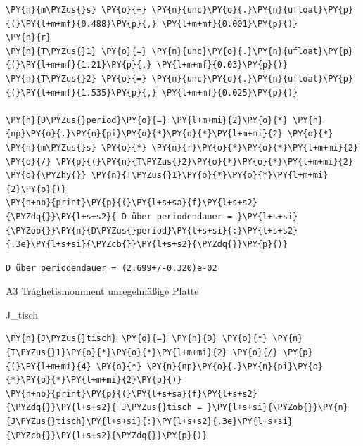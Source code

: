     \begin{tcolorbox}[breakable, size=fbox, boxrule=1pt, pad at break*=1mm,colback=cellbackground, colframe=cellborder]
\begin{Verbatim}[commandchars=\\\{\}]
\PY{n}{m\PYZus{}s} \PY{o}{=} \PY{n}{unc}\PY{o}{.}\PY{n}{ufloat}\PY{p}{(}\PY{l+m+mf}{0.488}\PY{p}{,} \PY{l+m+mf}{0.001}\PY{p}{)}
\PY{n}{r}
\PY{n}{T\PYZus{}1} \PY{o}{=} \PY{n}{unc}\PY{o}{.}\PY{n}{ufloat}\PY{p}{(}\PY{l+m+mf}{1.21}\PY{p}{,} \PY{l+m+mf}{0.03}\PY{p}{)}
\PY{n}{T\PYZus{}2} \PY{o}{=} \PY{n}{unc}\PY{o}{.}\PY{n}{ufloat}\PY{p}{(}\PY{l+m+mf}{1.535}\PY{p}{,} \PY{l+m+mf}{0.025}\PY{p}{)} 

\PY{n}{D\PYZus{}period}\PY{o}{=} \PY{l+m+mi}{2}\PY{o}{*} \PY{n}{np}\PY{o}{.}\PY{n}{pi}\PY{o}{*}\PY{o}{*}\PY{l+m+mi}{2} \PY{o}{*} \PY{n}{m\PYZus{}s} \PY{o}{*} \PY{n}{r}\PY{o}{*}\PY{o}{*}\PY{l+m+mi}{2} \PY{o}{/} \PY{p}{(}\PY{n}{T\PYZus{}2}\PY{o}{*}\PY{o}{*}\PY{l+m+mi}{2} \PY{o}{\PYZhy{}} \PY{n}{T\PYZus{}1}\PY{o}{*}\PY{o}{*}\PY{l+m+mi}{2}\PY{p}{)}
\PY{n+nb}{print}\PY{p}{(}\PY{l+s+sa}{f}\PY{l+s+s2}{\PYZdq{}}\PY{l+s+s2}{ D über periodendauer = }\PY{l+s+si}{\PYZob{}}\PY{n}{D\PYZus{}period}\PY{l+s+si}{:}\PY{l+s+s2}{.3e}\PY{l+s+si}{\PYZcb{}}\PY{l+s+s2}{\PYZdq{}}\PY{p}{)}
\end{Verbatim}
\end{tcolorbox}

    \begin{Verbatim}[commandchars=\\\{\}]
 D über periodendauer = (2.699+/-0.320)e-02
    \end{Verbatim}

    A3 Trághetismomment unregelmäßige Platte

    J\_tisch

    \begin{tcolorbox}[breakable, size=fbox, boxrule=1pt, pad at break*=1mm,colback=cellbackground, colframe=cellborder]
\begin{Verbatim}[commandchars=\\\{\}]
\PY{n}{J\PYZus{}tisch} \PY{o}{=} \PY{n}{D} \PY{o}{*} \PY{n}{T\PYZus{}1}\PY{o}{*}\PY{o}{*}\PY{l+m+mi}{2} \PY{o}{/} \PY{p}{(}\PY{l+m+mi}{4} \PY{o}{*} \PY{n}{np}\PY{o}{.}\PY{n}{pi}\PY{o}{*}\PY{o}{*}\PY{l+m+mi}{2}\PY{p}{)}
\PY{n+nb}{print}\PY{p}{(}\PY{l+s+sa}{f}\PY{l+s+s2}{\PYZdq{}}\PY{l+s+s2}{ J\PYZus{}tisch = }\PY{l+s+si}{\PYZob{}}\PY{n}{J\PYZus{}tisch}\PY{l+s+si}{:}\PY{l+s+s2}{.3e}\PY{l+s+si}{\PYZcb{}}\PY{l+s+s2}{\PYZdq{}}\PY{p}{)}
\end{Verbatim}
\end{tcolorbox}

